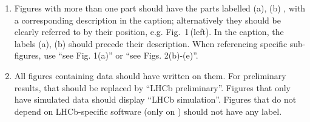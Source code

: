 \begin{enumerate}
\item Figures with more than one part should have the parts labelled
  (a), (b) \etc, with a corresponding description in the caption;
  alternatively they should be clearly referred to by their position,
  e.g. Fig.~1\,(left). In the caption, the labels (a), (b) \etc should
  precede their description. When referencing specific sub-figures,
  use ``see Fig. 1(a)'' or ``see Figs. 2(b)-(e)''.

\item All figures containing \lhcb data should have \lhcb written on
  them. For preliminary
  results, that should be replaced by ``LHCb preliminary''.
  Figures that only have simulated data should display ``LHCb simulation''.
  Figures that do not depend on LHCb-specific software (\eg only on \pythia)
  should not have any label.


\end{enumerate}
